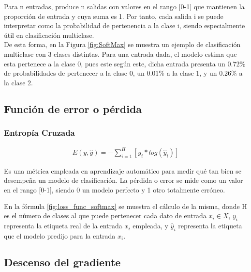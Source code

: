 Para n entradas, produce n salidas con valores en el rango [0-1] que mantienen la proporción de entrada y cuya suma es 1. Por tanto, cada salida i se puede interpretar como la probabilidad de pertenencia a la clase i, siendo especialmente útil en clasificación multiclase. \cite{SoftMax_MLM} \\
De esta forma, en la Figura \ref{fig:SoftMax} se muestra un ejemplo de clasificación multiclase con 3 clases distintas. Para una entrada dada, el modelo estima que esta pertenece a la clase 0, pues este según este, dicha entrada presenta un 0.72\% de probabilidades de pertenecer a la clase 0, un 0.01\% a la clase 1, y un 0.26\% a la clase 2.

\subsection{Función de error o pérdida}

\subsubsection{Entropía Cruzada}

\begin{gather}
	E(y, \hat{y}) = - \sum_{i=1}^{H}  [y_i * log( \hat{y}_i)]
	\label{fig:loss_func_softmax}
\end{gather}

Es una métrica empleada en aprendizaje automático para medir qué tan bien se desempeña un modelo de clasificación. La pérdida o error se mide como un valor en el rango [0-1], siendo 0 un modelo perfecto y 1 otro totalmente erróneo. \cite{Cross_entropy}

En la fórmula \ref{fig:loss_func_softmax} se muestra el cálculo de la misma, donde H es el número de clases al que puede pertenecer cada dato de entrada $x_i \in X$, $y_i$ representa la etiqueta real de la entrada $x_i$ empleada, y $\hat{y}_i$ representa la etiqueta que el modelo predijo para la entrada $x_i$. 


\subsection{Descenso del gradiente}

